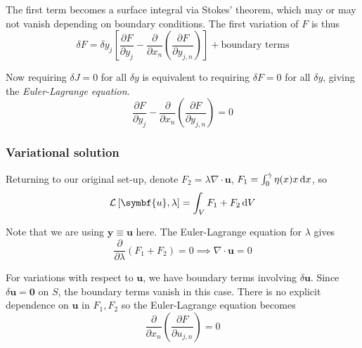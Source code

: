 \documentclass{jknotes}
\begin{document}
The first term becomes a surface integral via Stokes' theorem, which may or
may not vanish depending on boundary conditions. The first variation of $F$ is
thus
\begin{equation}
	\delta F = \delta y_j \left[ \frac{\partial F}{\partial y_j} -
		\frac{\partial}{\partial x_n} \left( \frac{\partial F}{\partial
	y_{j,n}}\right)\right] + \text{boundary terms}
\end{equation}

Now requiring $\delta J = 0$ for all $\delta y$ is equivalent to requiring
$\delta F = 0$ for all $\delta y$, giving the \emph{Euler-Lagrange equation}.
\begin{equation}
\frac{\partial F}{\partial y_j} - \frac{\partial}{\partial x_n} \left(
\frac{\partial F}{\partial y_{j,n}}\right) = 0
\end{equation}

\subsubsection{Variational solution}
Returning to our original set-up, denote $F_2 = \lambda \nabla \cdot \symbf{u}$,
$F_1 = \int_0^{\srate} \eta(x)x\,\diffd x$, so
\begin{equation}
	\mathcal{L}\left[\symbf{u},\lambda\right] = \int_V F_1 + F_2\,\diffd V
\end{equation}

Note that we are using $\symbf{y} \equiv \symbf{u}$ here.  The Euler-Lagrange
equation for $\lambda $ gives
\begin{equation}
	\frac{\partial}{\partial \lambda} \left( F_1 + F_2\right) = 0 \implies
	\nabla \cdot \symbf{u} = 0
\end{equation}

For variations with respect to $\symbf{u}$, we have boundary terms involving
$\delta \symbf{u}$. Since $\delta \symbf{u} = \symbf{0}$ on $S$, the boundary terms
vanish in this case. There is no explicit dependence on $\symbf{u}$ in $F_1, F_2$
so the Euler-Lagrange equation becomes
\begin{equation}
	\frac{\partial}{\partial x_n} \left( \frac{\partial F}{\partial
	u_{j,n}}\right) = 0
\end{equation}
\end{document}

